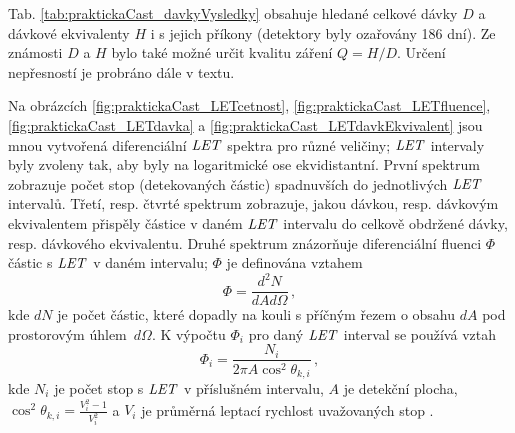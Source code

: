 Tab. \ref{tab:praktickaCast_davkyVysledky} obsahuje hledané celkové dávky $D$ a dávkové ekvivalenty $H$ i s jejich příkony (detektory byly ozařovány 186 dní). Ze známosti $D$ a $H$ bylo také možné určit kvalitu záření $Q=H/D$. Určení nepřesností je probráno dále v textu.

Na obrázcích \ref{fig:praktickaCast_LETcetnost}, \ref{fig:praktickaCast_LETfluence}, \ref{fig:praktickaCast_LETdavka} a \ref{fig:praktickaCast_LETdavkEkvivalent} jsou mnou vytvořená diferenciální $\mathit{LET}$ spektra pro různé veličiny; $\mathit{LET}$ intervaly byly zvoleny tak, aby byly na logaritmické ose ekvidistantní. První spektrum zobrazuje počet stop (detekovaných částic) spadnuvších do jednotlivých $\mathit{LET}$ intervalů. Třetí, resp. čtvrté spektrum zobrazuje, jakou dávkou, resp. dávkovým ekvivalentem přispěly částice v daném $\mathit{LET}$ intervalu do celkově obdržené dávky, resp. dávkového ekvivalentu. Druhé spektrum znázorňuje diferenciální fluenci $\Phi$ částic s $\mathit{LET}$ v daném intervalu; $\Phi$ je definována vztahem
\begin{equation}
  \Phi=\frac{d^2N}{dAd\Omega}\,,
  \label{eq:praktickaCast_fluence}
\end{equation}
kde $dN$ je počet částic, které dopadly na kouli s příčným řezem o obsahu $dA$ pod prostorovým úhlem~$d\Omega$. K výpočtu $\Phi_i$ pro daný $\mathit{LET}$ interval se používá vztah
\begin{equation}
  \Phi_i=\frac{N_i}{2\pi A\cos^2\theta_{k,i}}\,,
  \label{eq:praktickaCast_fluenceVypocet}
\end{equation}
kde $N_i$ je počet stop s $\mathit{LET}$ v příslušném intervalu, $A$ je detekční plocha, $\cos^2\theta_{k,i}=\frac{V^2_i-1}{V^2_i}$ a $V_i$ je průměrná leptací rychlost uvažovaných stop \cite{ssntd}.

